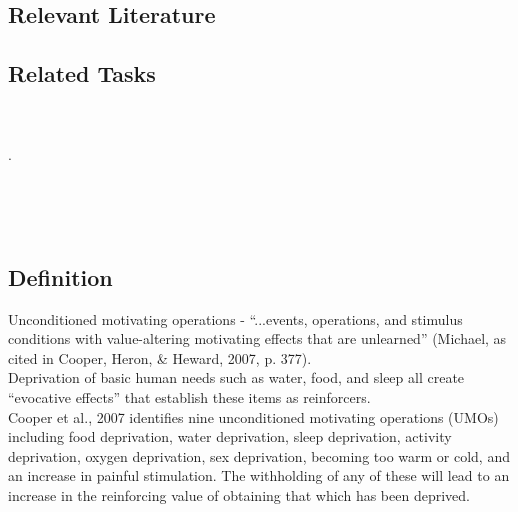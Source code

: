\subsection{Relevant Literature}
\begin{refsection}
\nocite{test,alang2017police,clayton2018black}
\printbibliography[heading=none]
\end{refsection}
%
\subsection{Related Tasks}
\foureOne{}\\
\fourdOne{}\\.
\fourdSixteen{}\\
\fourFKFourteen{}\\
\fourFKFifteen{}\\
\fourFKSixteen{}\\
%
%
%
%
%
\section{\fourFKTwentySix{}}
\subsection{Definition}
Unconditioned motivating operations - ``...events, operations, and stimulus conditions with value-altering motivating effects that are unlearned'' (Michael, as cited in Cooper, Heron, \& Heward, 2007, p. 377).\\
Deprivation of basic human needs such as water, food, and sleep all create ``evocative effects'' that establish these items as reinforcers.\\

Cooper et al., 2007 identifies nine unconditioned motivating operations (UMOs) including food deprivation, water deprivation, sleep deprivation, activity deprivation, oxygen deprivation, sex deprivation, becoming too warm or cold, and an increase in painful stimulation. The withholding of any of these will lead to an increase in the reinforcing value of obtaining that which has been deprived.\\

